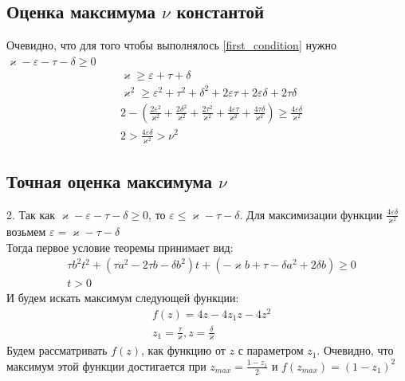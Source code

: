 \documentclass[a4paper]{article}
\begin{document}
\subsection{Оценка максимума $\nu$ константой}
Очевидно, что для того чтобы выполнялось \eqref{first_condition} нужно  $\varkappa - \varepsilon - \tau - \delta \geq 0$
\begin{equation}\label{const_ineq}
 \begin{aligned}
&\varkappa \geq \varepsilon+\tau+\delta \\
&\varkappa^2 \geq \varepsilon^2 + \tau^2 + \delta^2 + 2\varepsilon\tau + 2\varepsilon\delta + 2\tau\delta\\
&2 -(\frac{2\varepsilon^2}{\varkappa^2} + \frac{2\delta^2}{\varkappa^2} + \frac{2\tau^2}{\varkappa^2} +\frac{4\varepsilon\tau}{\varkappa^2} + \frac{4\tau\delta}{\varkappa^2}) \geq \frac{4\varepsilon\delta}{\varkappa^2}\\
&2 > \frac{4\varepsilon\delta}{\varkappa^2} > \nu^2
 \end{aligned}
\end{equation}

\subsection{Точная оценка максимума $\nu$}
2. Так как $\varkappa - \varepsilon - \tau - \delta \geq 0$, то $ \varepsilon \leq \varkappa - \tau - \delta$. Для максимизации функции $\frac{4\varepsilon\delta}{\varkappa^2}$ возьмем $\varepsilon = \varkappa - \tau - \delta$\\
Тогда первое условие теоремы принимает вид:
\begin{equation}\label{ineq1} 
 \begin{aligned}
&\tau b^2t^2 + (\tau a^2-2 \tau b - \delta b^2)t + (-\varkappa b+\tau-\delta a^2 + 2\delta b) \geq 0\\
&t > 0
 \end{aligned}
\end{equation}
И будем искать максимум следующей функции: 
\begin{equation}
 \begin{aligned}
&f(z) = 4z-4z_1z - 4z^2\\
&z_1 = \frac{\tau}{\varkappa}, z = \frac{\delta}{\varkappa}
 \end{aligned}
\end{equation} 
Будем рассматривать $f(z)$, как функцию от $z$ с параметром $z_1$. Очевидно, что максимум этой функции достигается при $z_{max} = \frac{1-z_1}{2}$ и $f(z_{max}) = (1-z_1)^2$\\
\end{document}
